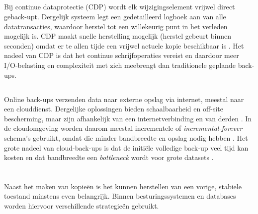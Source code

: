 \subsection{}%
\label{subsec:cdp}

Bij continue dataprotectie (CDP) wordt elk wijzigingselement vrijwel direct geback-upt. Dergelijk systeem legt een gedetailleerd logboek aan van alle datatransacties, waardoor herstel tot een willekeurig punt in het verleden mogelijk is. CDP maakt snelle herstelling mogelijk (herstel gebeurt binnen seconden) omdat er te allen tijde een vrijwel actuele kopie beschikbaar is \autocite{Barney2024}. Het nadeel van CDP is dat het continue schrijfoperaties vereist en daardoor meer I/O-belasting en complexiteit met zich meebrengt dan traditionele geplande back-ups.

\subsection{}%
\label{subsec:online-cloud}

Online back-ups verzenden data naar externe opslag via internet, meestal naar een clouddienst. Dergelijke oplossingen bieden schaalbaarheid en off-site bescherming, maar zijn afhankelijk van een internetverbinding en van derden \autocite{Kirvan2023}. In de cloudomgeving worden daarom meestal incrementele of \textit{incremental-forever} schema’s gebruikt, omdat die minder bandbreedte en opslag nodig hebben \autocite{Sullivan2025}. Het grote nadeel van cloud-back-ups is dat de initiële volledige back-up veel tijd kan kosten en dat bandbreedte een \textit{bottleneck} wordt voor grote datasets \autocite{Kirvan2023}.

\section{}%
\label{sec:rollback-en-hersteltechnieken}

Naast het maken van kopieën is het kunnen herstellen van een vorige, stabiele toestand minstens even belangrijk. Binnen besturingssystemen en databases worden hiervoor verschillende strategieën gebruikt.

\subsection{}%
\label{subsec:journaling}

